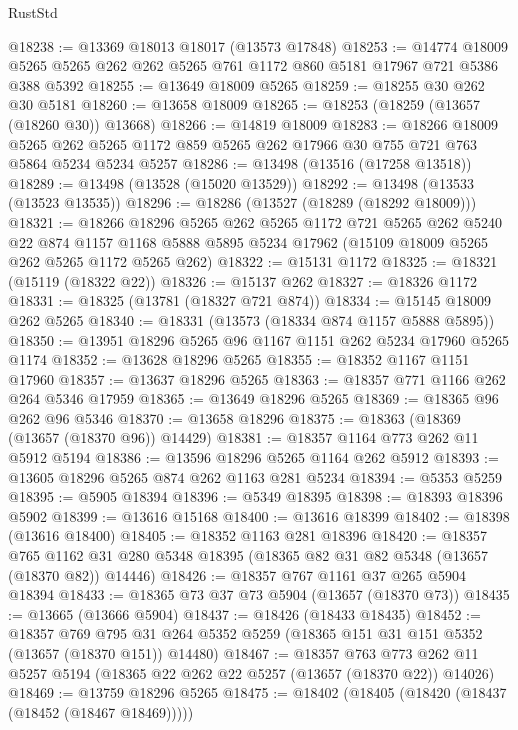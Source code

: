 \begin{lexlean}{RustStd}
\begin{coremodule}
@18238 := @13369 @18013 @18017 (@13573 @17848)
@18253 := @14774
    @18009
    @5265
    @5265
    @262
    @262
    @5265
    @761
    @1172
    @860
    @5181
    @17967
    @721
    @5386
    @388
    @5392
@18255 := @13649 @18009 @5265
@18259 := @18255 @30 @262 @30 @5181
@18260 := @13658 @18009
@18265 := @18253 (@18259 (@13657 (@18260 @30)) @13668)
@18266 := @14819 @18009
@18283 := @18266
    @18009
    @5265
    @262
    @5265
    @1172
    @859
    @5265
    @262
    @17966
    @30
    @755
    @721
    @763
    @5864
    @5234
    @5234
    @5257
@18286 := @13498 (@13516 (@17258 @13518))
@18289 := @13498 (@13528 (@15020 @13529))
@18292 := @13498 (@13533 (@13523 @13535))
@18296 := @18286 (@13527 (@18289 (@18292 @18009)))
@18321 := @18266
    @18296
    @5265
    @262
    @5265
    @1172
    @721
    @5265
    @262
    @5240
    @22
    @874
    @1157
    @1168
    @5888
    @5895
    @5234
    @17962
    (@15109 @18009 @5265 @262 @5265 @1172 @5265 @262)
@18322 := @15131 @1172
@18325 := @18321 (@15119 (@18322 @22))
@18326 := @15137 @262
@18327 := @18326 @1172
@18331 := @18325 (@13781 (@18327 @721 @874))
@18334 := @15145 @18009 @262 @5265
@18340 := @18331 (@13573 (@18334 @874 @1157 @5888 @5895))
@18350 := @13951 @18296 @5265 @96 @1167 @1151 @262 @5234 @17960 @5265 @1174
@18352 := @13628 @18296 @5265
@18355 := @18352 @1167 @1151 @17960
@18357 := @13637 @18296 @5265
@18363 := @18357 @771 @1166 @262 @264 @5346 @17959
@18365 := @13649 @18296 @5265
@18369 := @18365 @96 @262 @96 @5346
@18370 := @13658 @18296
@18375 := @18363 (@18369 (@13657 (@18370 @96)) @14429)
@18381 := @18357 @1164 @773 @262 @11 @5912 @5194
@18386 := @13596 @18296 @5265 @1164 @262 @5912
@18393 := @13605 @18296 @5265 @874 @262 @1163 @281 @5234
@18394 := @5353 @5259
@18395 := @5905 @18394
@18396 := @5349 @18395
@18398 := @18393 @18396 @5902
@18399 := @13616 @15168
@18400 := @13616 @18399
@18402 := @18398 (@13616 @18400)
@18405 := @18352 @1163 @281 @18396
@18420 := @18357
    @765
    @1162
    @31
    @280
    @5348
    @18395
    (@18365 @82 @31 @82 @5348 (@13657 (@18370 @82)) @14446)
@18426 := @18357 @767 @1161 @37 @265 @5904 @18394
@18433 := @18365 @73 @37 @73 @5904 (@13657 (@18370 @73))
@18435 := @13665 (@13666 @5904)
@18437 := @18426 (@18433 @18435)
@18452 := @18357
    @769
    @795
    @31
    @264
    @5352
    @5259
    (@18365 @151 @31 @151 @5352 (@13657 (@18370 @151)) @14480)
@18467 := @18357
    @763
    @773
    @262
    @11
    @5257
    @5194
    (@18365 @22 @262 @22 @5257 (@13657 (@18370 @22)) @14026)
@18469 := @13759 @18296 @5265
@18475 := @18402 (@18405 (@18420 (@18437 (@18452 (@18467 @18469)))))

\end{coremodule}
\end{lexlean}
